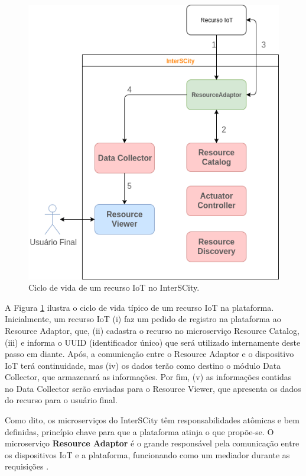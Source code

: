 \begin{figure}
  \centering
    \includegraphics[scale=0.5]{figuras/interscity_flow.png}
  \caption{Ciclo de vida de um recurso IoT no InterSCity.}
  \label{fig:interscity-lifecycle}
\end{figure}

A Figura \ref{fig:interscity-lifecycle} ilustra o ciclo de vida típico de um
recurso IoT na plataforma. Inicialmente, um recurso IoT (i) faz um pedido de
registro na plataforma ao Resource Adaptor, que, (ii) cadastra o recurso no
microserviço Resource Catalog, (iii) e informa o UUID
(identificador único) que será utilizado internamente deste passo em diante.
Após, a comunicação entre o Resource Adaptor e o dispositivo IoT terá
continuidade, mas (iv) os dados terão como destino o módulo Data Collector,
que armazenará as informações. Por fim, (v) as informações contidas no
Data Collector serão enviadas para o Resource Viewer, que apresenta os
dados do recurso para o usuário final.

Como dito, os microserviços do InterSCity têm responsabilidades atômicas e bem
definidas, princípio chave para que a plataforma atinja o que propõe-se. O
microserviço \textbf{Resource Adaptor} é o grande responsável pela comunicação
entre os dispositivos IoT e a plataforma, funcionando como um mediador
durante as requisições \cite{delesposte2017}.

